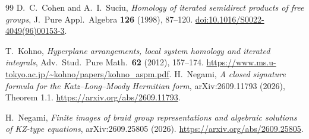 \documentclass[11pt,a4paper]{article}
\theoremstyle{remark}\newtheorem{remark}[theorem]{Remark}
\begin{document}
\begin{thebibliography}{99}
D.~C.~Cohen and A.~I.~Suciu,
\emph{Homology of iterated semidirect products of free groups},
J.~Pure Appl.~Algebra \textbf{126} (1998), 87--120.
\href{https://doi.org/10.1016/S0022-4049(96)00153-3}{doi:10.1016/S0022-4049(96)00153-3}.

T.~Kohno, \emph{Hyperplane arrangements, local system homology and
iterated integrals}, Adv.~Stud.~Pure Math.~\textbf{62} (2012), 157--174.
\url{https://www.ms.u-tokyo.ac.jp/~kohno/papers/kohno_aspm.pdf}.
H.~Negami, \emph{A closed signature formula for the Katz--Long--Moody
Hermitian form}, arXiv:2609.11793 (2026), Theorem 1.1.
\url{https://arxiv.org/abs/2609.11793}.

H.~Negami, \emph{Finite images of braid group representations and
algebraic solutions of KZ-type equations}, arXiv:2609.25805 (2026).
\url{https://arxiv.org/abs/2609.25805}.

\end{thebibliography}
\end{document}
